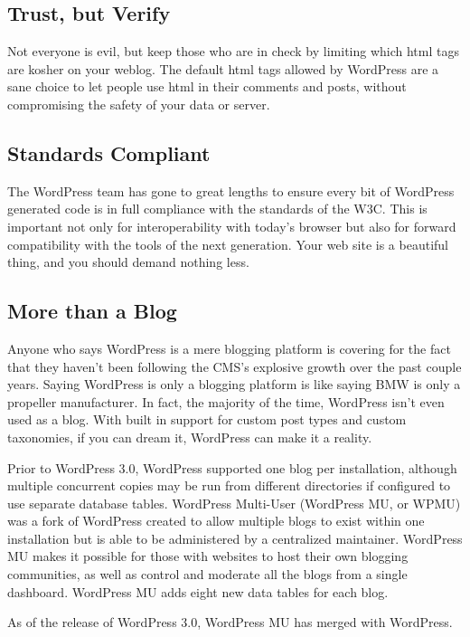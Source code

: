 \subsection{Trust, but Verify}

Not everyone is evil, but keep those who are in check by limiting which html tags are kosher on your weblog. The default html tags allowed by WordPress are a sane choice to let people use html in their comments and posts, without compromising the safety of your data or server.

\subsection{Standards Compliant}

The WordPress team has gone to great lengths to ensure every bit of WordPress generated code is in full compliance with the standards of the W3C. This is important not only for interoperability with today’s browser but also for forward compatibility with the tools of the next generation. Your web site is a beautiful thing, and you should demand nothing less.

\subsection{More than a Blog}
 
Anyone who says WordPress is a mere blogging platform is covering for the fact that they haven't been following the CMS's explosive growth over the past couple years. Saying WordPress is only a blogging platform is like saying BMW is only a propeller manufacturer. In fact, the majority of the time, WordPress isn't even used as a blog. With built in support for custom post types and custom taxonomies, if you can dream it, WordPress can make it a reality.

Prior to WordPress 3.0, WordPress supported one blog per installation, although multiple concurrent copies may be run from different directories if configured to use separate database tables. WordPress Multi-User (WordPress MU, or WPMU) was a fork of WordPress created to allow multiple blogs to exist within one installation but is able to be administered by a centralized maintainer. WordPress MU makes it possible for those with websites to host their own blogging communities, as well as control and moderate all the blogs from a single dashboard. WordPress MU adds eight new data tables for each blog.

As of the release of WordPress 3.0, WordPress MU has merged with WordPress.


